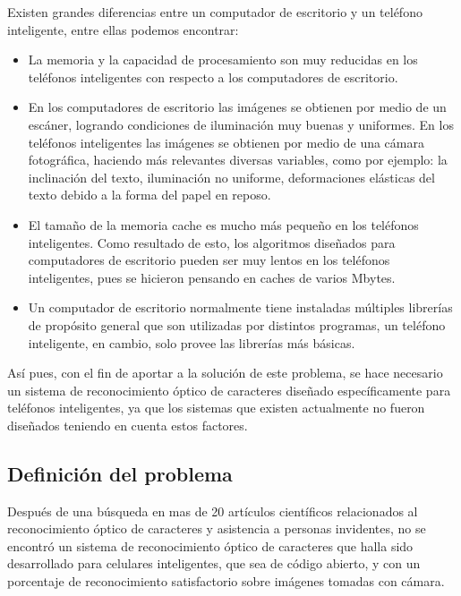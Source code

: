 \documentclass[a4paper, 11pt, oneside]{article}
\begin{document}
	Existen grandes diferencias entre un computador de escritorio y un teléfono inteligente, entre ellas podemos encontrar:
	\begin{itemize}
	\item La memoria y la capacidad de procesamiento son muy reducidas en los teléfonos inteligentes con respecto a los computadores de escritorio.

	\item En los computadores de escritorio las imágenes se obtienen por medio de un escáner, logrando condiciones de iluminación muy buenas y uniformes. En los teléfonos inteligentes las imágenes se obtienen por medio de una cámara fotográfica, haciendo más relevantes diversas variables, como por ejemplo: la inclinación del texto, iluminación no uniforme, deformaciones elásticas del texto debido a la forma del papel en reposo.

	\item El tamaño de la memoria cache es mucho más pequeño en los teléfonos inteligentes. Como resultado de esto, los algoritmos diseñados para computadores de escritorio pueden ser muy lentos en los teléfonos inteligentes, pues se hicieron pensando en caches de varios Mbytes.

	\item Un computador de escritorio normalmente tiene instaladas múltiples librerías de propósito general que son utilizadas por distintos programas, un teléfono inteligente, en cambio, solo provee las librerías más básicas.
	\end{itemize}

	Así pues, con el fin de aportar a la solución de este problema, se hace necesario un sistema de reconocimiento óptico de caracteres diseñado específicamente para teléfonos inteligentes, ya que los sistemas que existen actualmente no fueron diseñados teniendo en cuenta estos factores. 
	
	\subsection{Definición del problema}
	Después de una búsqueda en mas de 20 artículos científicos relacionados al reconocimiento óptico
	de caracteres y asistencia a personas invidentes, no se encontró un sistema de reconocimiento
	óptico de caracteres que halla sido desarrollado para celulares inteligentes, que sea de 
	código abierto, y con un porcentaje de reconocimiento satisfactorio sobre imágenes tomadas con
	cámara.
	
	\clearpage
\end{document}
